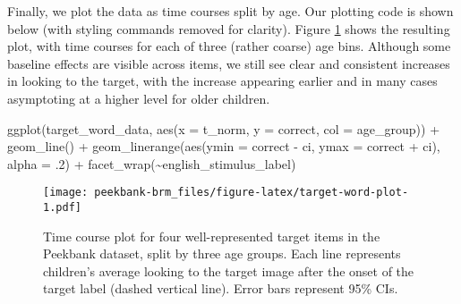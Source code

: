 \documentclass[
  english,
  man,floatsintext]{apa6}
\newenvironment{Shaded}{\begin{snugshade}}{\end{snugshade}}
\newcommand{\AttributeTok}[1]{\textcolor[rgb]{0.77,0.63,0.00}{#1}}
\newcommand{\DecValTok}[1]{\textcolor[rgb]{0.00,0.00,0.81}{#1}}
\newcommand{\FunctionTok}[1]{\textcolor[rgb]{0.00,0.00,0.00}{#1}}
\newcommand{\NormalTok}[1]{#1}
\newcommand{\SpecialCharTok}[1]{\textcolor[rgb]{0.00,0.00,0.00}{#1}}
\begin{document}
Finally, we plot the data as time courses split by age. Our plotting code is shown below (with styling commands removed for clarity). Figure \ref{fig:target-word-plot} shows the resulting plot, with time courses for each of three (rather coarse) age bins.
Although some baseline effects are visible across items, we still see clear and consistent increases in looking to the target, with the increase appearing earlier and in many cases asymptoting at a higher level for older children.

\begin{Shaded}
\begin{Highlighting}[]
\FunctionTok{ggplot}\NormalTok{(target\_word\_data, }
       \FunctionTok{aes}\NormalTok{(}\AttributeTok{x =}\NormalTok{ t\_norm, }\AttributeTok{y =}\NormalTok{ correct, }\AttributeTok{col =}\NormalTok{ age\_group)) }\SpecialCharTok{+} 
  \FunctionTok{geom\_line}\NormalTok{() }\SpecialCharTok{+} 
  \FunctionTok{geom\_linerange}\NormalTok{(}\FunctionTok{aes}\NormalTok{(}\AttributeTok{ymin =}\NormalTok{ correct }\SpecialCharTok{{-}}\NormalTok{ ci, }\AttributeTok{ymax =}\NormalTok{ correct }\SpecialCharTok{+}\NormalTok{ ci), }
                 \AttributeTok{alpha =}\NormalTok{ .}\DecValTok{2}\NormalTok{) }\SpecialCharTok{+} 
  \FunctionTok{facet\_wrap}\NormalTok{(}\SpecialCharTok{\textasciitilde{}}\NormalTok{english\_stimulus\_label)}
\end{Highlighting}
\end{Shaded}

\begin{figure}
\centering
\texttt{[image: peekbank-brm\_files/figure-latex/target-word-plot-1.pdf]}
\caption{\label{fig:target-word-plot}Time course plot for four well-represented target items in the Peekbank dataset, split by three age groups. Each line represents children's average looking to the target image after the onset of the target label (dashed vertical line). Error bars represent 95\% CIs.}
\end{figure}
\end{document}
